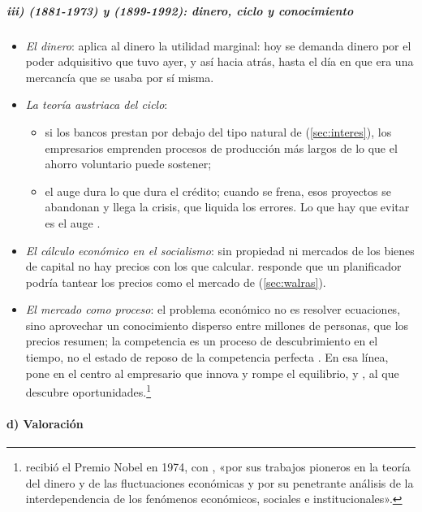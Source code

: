 \documentclass[11pt]{article}
\begin{document}
\subparagraph{iii)  (1881-1973) y  (1899-1992): dinero, ciclo y conocimiento}

\begin{itemize}
\item \emph{El dinero}: \textcite{Mises1912Theorie} aplica al dinero la utilidad marginal: hoy se demanda dinero por el poder adquisitivo que tuvo ayer, y así hacia atrás, hasta el día en que era una mercancía que se usaba por sí misma.
\item \emph{La teoría austriaca del ciclo}\nocite{Mises1912Theorie,Hayek1931Prices}:
  \begin{itemize}
  \item si los bancos prestan por debajo del tipo natural de  (\ref{sec:interes}), los empresarios emprenden procesos de producción más largos de lo que el ahorro voluntario puede sostener;
  \item el auge dura lo que dura el crédito; cuando se frena, esos proyectos se abandonan y llega la crisis, que liquida los errores. Lo que hay que evitar es el auge .
  \end{itemize}
\item \emph{El cálculo económico en el socialismo}: sin propiedad ni mercados de los bienes de capital no hay precios con los que calcular\nocite{Mises1920Wirtschaftsrechnung}. \textcite{Lange1936Socialism} responde que un planificador podría tantear los precios como el mercado de  (\ref{sec:walras}).
\item \emph{El mercado como proceso}: el problema económico no es resolver ecuaciones, sino aprovechar un conocimiento disperso entre millones de personas, que los precios resumen\nocite{Hayek1945Use}; la competencia es un proceso de descubrimiento en el tiempo, no el estado de reposo de la competencia perfecta\nocite{Hayek1948Meaning} . En esa línea, \textcite{Schumpeter1912Theorie} pone en el centro al empresario que innova y rompe el equilibrio, y \textcite{Kirzner1973Competition}, al que descubre oportunidades.\footnote{ recibió el Premio Nobel en 1974, con , «por sus trabajos pioneros en la teoría del dinero y de las fluctuaciones económicas y por su penetrante análisis de la interdependencia de los fenómenos económicos, sociales e institucionales»\nocite{Nobel1974}.}
\end{itemize}

\paragraph{d) Valoración}
\end{document}
